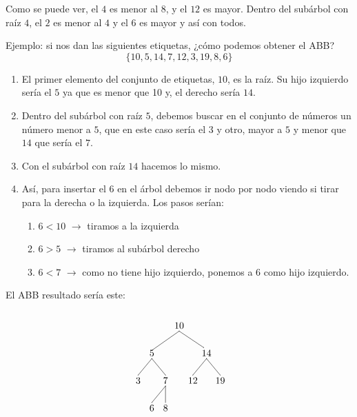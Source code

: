 \documentclass[10pt,a4paper,spanish]{report}
\begin{document}
\noindent
Como se puede ver, el $4$ es menor al $8$, y el $12$ es mayor. Dentro del subárbol con raíz $4$, el $2$ es menor al $4$ y el $6$ es mayor y así con todos.

\noindent
Ejemplo: si nos dan las siguientes etiquetas, ¿cómo podemos obtener el ABB?
\begin{displaymath}
\{10, 5, 14, 7, 12, 3, 19, 8, 6\}
\end{displaymath}

\begin{enumerate}[$\bigstar$]
      \item El primer elemento del conjunto de etiquetas, $10$, es la raíz. Su hijo izquierdo sería el $5$ ya que es menor que 10 y, el derecho sería $14$.
      \item Dentro del subárbol con raíz $5$, debemos buscar en el conjunto de números un número menor a $5$, que en este caso sería el $3$ y otro, mayor a $5$ y menor que $14$ que sería el $7$.
      \item Con el subárbol con raíz $14$ hacemos lo mismo.
      \item Así, para insertar el $6$ en el árbol debemos ir nodo por nodo viendo si tirar para la derecha o la izquierda. Los pasos serían:
      \begin{enumerate}
            \item $6 < 10$ $\longrightarrow$ tiramos a la izquierda
            \item $6 > 5$ $\longrightarrow$ tiramos al subárbol derecho
            \item $6 < 7$ $\longrightarrow$ como no tiene hijo izquierdo, ponemos a $6$ como hijo izquierdo.
      \end{enumerate}
\end{enumerate}

\noindent
El ABB resultado sería este: \label{ejemplo_abb}

\[\begin{xy}
,(0,0)*+=<10mm>[]\txt<2cm>{10}
,(-10,-10)*+=<10mm>[]\txt<2cm>{5}
,(10,-10)*+=<10mm>[]\txt<2cm>{14}
,(-15,-20)*+=<10mm>[]\txt<2cm>{3}
,(-5,-20)*+=<10mm>[]\txt<2cm>{7}
,(5,-20)*+=<10mm>[]\txt<2cm>{12}
,(15,-20)*+=<10mm>[]\txt<2cm>{19}
,(-10,-30)*+=<10mm>[]\txt<2cm>{6}
,(-5,-30)*+=<10mm>[]\txt<2cm>{8}

\ar@{-} (0,-2);(-10,-9) %
\ar@{-} (0,-2);(9,-8) %
\ar@{-} (-10,-12);(-15,-18) %
\ar@{-} (10,-12);(5,-18) %
\ar@{-} (10,-12);(15,-18) %
\ar@{-} (-10,-12);(-5,-18) %
\ar@{-} (-5,-22);(-10,-28) %
\ar@{-} (-5,-22);(-5,-28)
\end{xy}\]
\end{document}
